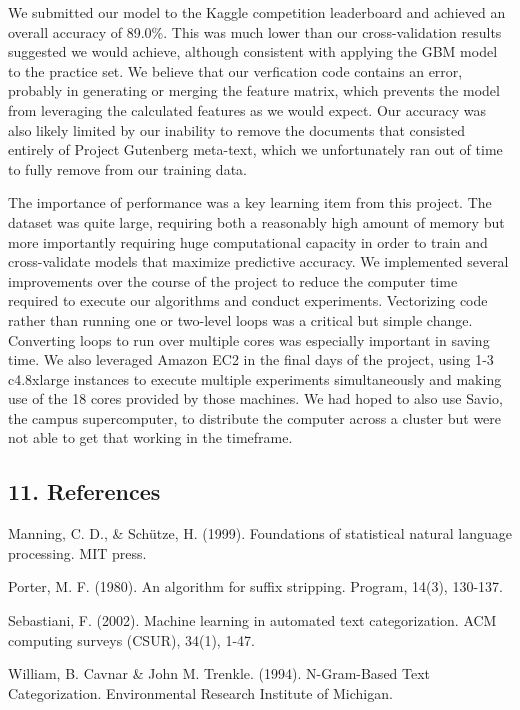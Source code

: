 \documentclass[12pt,]{article}
\begin{document}
We submitted our model to the Kaggle competition leaderboard and
achieved an overall accuracy of 89.0\%. This was much lower than our
cross-validation results suggested we would achieve, although consistent
with applying the GBM model to the practice set. We believe that our
verfication code contains an error, probably in generating or merging
the feature matrix, which prevents the model from leveraging the
calculated features as we would expect. Our accuracy was also likely
limited by our inability to remove the documents that consisted entirely
of Project Gutenberg meta-text, which we unfortunately ran out of time
to fully remove from our training data.

The importance of performance was a key learning item from this project.
The dataset was quite large, requiring both a reasonably high amount of
memory but more importantly requiring huge computational capacity in
order to train and cross-validate models that maximize predictive
accuracy. We implemented several improvements over the course of the
project to reduce the computer time required to execute our algorithms
and conduct experiments. Vectorizing code rather than running one or
two-level loops was a critical but simple change. Converting loops to
run over multiple cores was especially important in saving time. We also
leveraged Amazon EC2 in the final days of the project, using 1-3
c4.8xlarge instances to execute multiple experiments simultaneously and
making use of the 18 cores provided by those machines. We had hoped to
also use Savio, the campus supercomputer, to distribute the computer
across a cluster but were not able to get that working in the timeframe.

\subsection{11. References}\label{references}

Manning, C. D., \& Schütze, H. (1999). Foundations of statistical
natural language processing. MIT press.

Porter, M. F. (1980). An algorithm for suffix stripping. Program, 14(3),
130-137.

Sebastiani, F. (2002). Machine learning in automated text
categorization. ACM computing surveys (CSUR), 34(1), 1-47.

William, B. Cavnar \& John M. Trenkle. (1994). N-Gram-Based Text
Categorization. Environmental Research Institute of Michigan.
\end{document}
